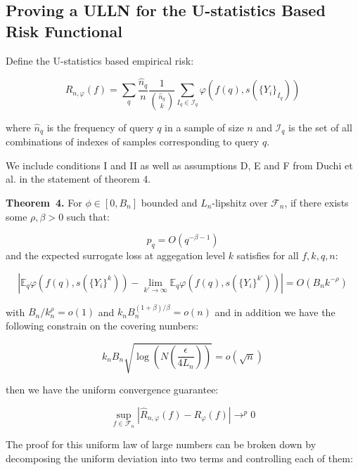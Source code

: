 \documentclass[a4paper,10pt]{article}
\newenvironment{theorem}[1][]{\par\medskip
   \noindent \textbf{Theorem~#1.} \rmfamily}{\medskip}
\begin{document}
\subsection{Proving a ULLN for the U-statistics Based Risk Functional}

Define the U-statistics based empirical risk:

\begin{equation}
  \hat{R}_{n, \varphi}(f) = \sum_q \frac{\hat{n}_q}{n} \frac{1}{\binom{\hat{n}_q}{k}} \sum_{I_q \in \mathcal{I}_q}\varphi(f(q), s(\{Y_i\}_{I_q}))
\end{equation}

where \(\hat{n}_q\) is the frequency of query \(q\) in a sample of size \(n\) and \(\mathcal{I}_q\) is the set of all combinations of indexes of samples corresponding to query \(q\).

We include conditions I and II as well as assumptions D, E and F from Duchi et al. \cite{duchi-2013-ranking} in the statement of theorem 4.
\begin{theorem}[4]
  For \(\phi \in [0, B_n]\) bounded and \(L_n\)-lipshitz over \(\mathcal{F}_n\),
  if there exists some \(\rho, \beta > 0\) such that:

  \begin{equation}
    p_q = O(q^{-\beta -1})
  \end{equation}
  and the expected surrogate loss at aggegation level \(k\) satisfies for all \(f, k, q, n\):

  \begin{equation}
    \left|\mathbb{E}_q\varphi(f(q), s(\{Y_i\}^k)) - \lim_{k' \rightarrow \infty}\mathbb{E}_q\varphi(f(q), s(\{Y_i\}^{k'}))\right| = O(B_nk^{-\rho})
  \end{equation}

  with \(B_n/k_n^\rho = o(1)\) and \(k_nB_n^{(1+\beta)/\beta}=o(n)\) and in addition we have the following constrain on the covering numbers:

  \begin{equation}
    k_nB_n\sqrt{\log\left( N(\frac{\epsilon}{4L_n}) \right)} = o(\sqrt n)
  \end{equation}

  then we have the uniform convergence guarantee:

  \begin{equation}
    \sup_{f \in \mathcal{F}_n}\left| \hat{R}_{n, \varphi}(f) - R_\varphi(f) \right| \rightarrow^p 0
  \end{equation}


\end{theorem}
The proof for this uniform law of large numbers can be broken down by decomposing the uniform deviation into two terms and controlling each of them:
\end{document}
